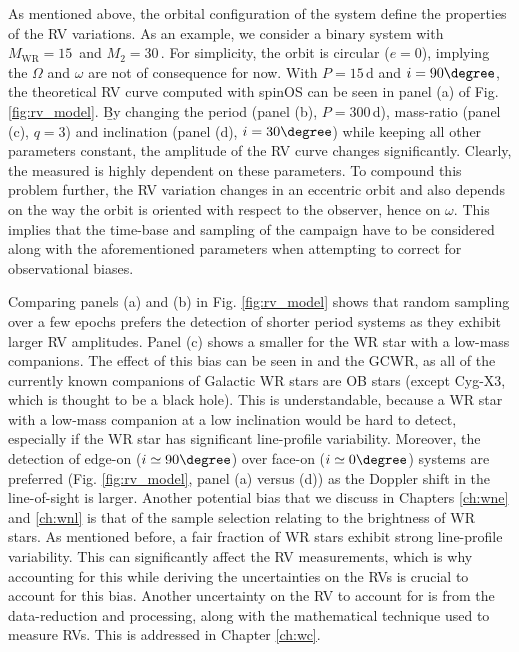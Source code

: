 As mentioned above, the orbital configuration of the system define the properties of the RV variations. As an example, we consider a binary system with $M_{\textrm{WR}} = 15\,$\Msun{} and $M_2 = 30\,$\Msun{}. For simplicity, the orbit is circular ($e=0$), implying the $\Omega$ and $\omega$ are not of consequence for now. With $P=15\,$d and $i=90\degree$, the theoretical RV curve computed with spinOS \citep{2021Fabry} can be seen in panel (a) of Fig. \ref{fig:rv_model}. \b{By changing the period (panel (b), $P=300\,$d), mass-ratio (panel (c), $q=3$) and inclination (panel (d), $i=30\degree$) while keeping all other parameters constant, the amplitude of the RV curve changes significantly.} Clearly, the measured \DelRV{} is highly dependent on these parameters. To compound this problem further, the RV variation changes in an eccentric orbit and also depends on the way the orbit is oriented with respect to the observer, hence on $\omega$. This implies that the time-base and sampling of the campaign have to be considered along with the aforementioned parameters when attempting to correct for observational biases.

Comparing panels (a) and (b) in Fig. \ref{fig:rv_model} shows that random sampling over a few epochs prefers the detection of shorter period systems as they exhibit larger RV amplitudes. Panel (c) shows a smaller \DelRV{} for the WR star with a low-mass companions. The effect of this bias can be seen in  and the GCWR, as all of the currently known companions of Galactic WR stars are OB stars (except Cyg-X3, which is thought to be a black hole). This is understandable, because a WR star with a low-mass companion at a low inclination would be hard to detect, especially if the WR star has significant line-profile variability. Moreover, the detection of edge-on ($i \simeq 90 \degree$) over face-on ($i \simeq 0 \degree$) systems are preferred (Fig. \ref{fig:rv_model}, panel (a) versus (d)) as the Doppler shift in the line-of-sight is larger. Another potential bias that we discuss in Chapters \ref{ch:wne} and \ref{ch:wnl} is that of the sample selection relating to the brightness of WR stars. As mentioned before, a fair fraction of WR stars exhibit strong line-profile variability. This can significantly affect the RV measurements, which is why accounting for this while deriving the uncertainties on the RVs is crucial to account for this bias. Another uncertainty on the RV to account for is from the data-reduction and processing, along with the mathematical technique used to measure RVs. This is addressed in Chapter \ref{ch:wc}.

